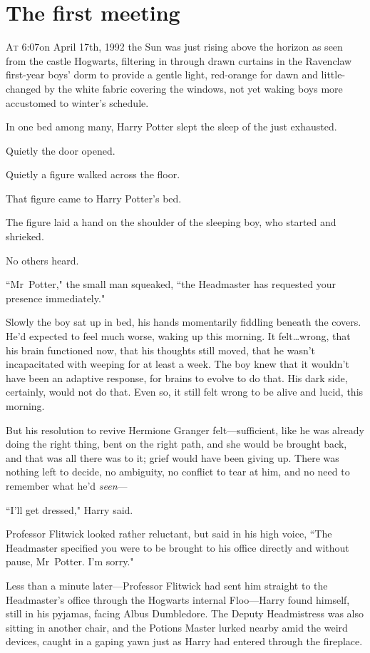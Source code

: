 
\section{The first meeting}

\lettrine{A}{t} 6:07\am on April 17th, 1992 the Sun was just rising above the horizon as seen from the castle Hogwarts, filtering in through drawn curtains in the Ravenclaw first-year boys' dorm to provide a gentle light, red-orange for dawn and little-changed by the white fabric covering the windows, not yet waking boys more accustomed to winter's schedule.

In one bed among many, Harry Potter slept the sleep of the just exhausted.

Quietly the door opened.

Quietly a figure walked across the floor.

That figure came to Harry Potter's bed.

The figure laid a hand on the shoulder of the sleeping boy, who started and shrieked.

No others heard.

``Mr~Potter," the small man squeaked, ``the Headmaster has requested your presence immediately."

Slowly the boy sat up in bed, his hands momentarily fiddling beneath the covers. He'd expected to feel much worse, waking up this morning. It felt…wrong, that his brain functioned now, that his thoughts still moved, that he wasn't incapacitated with weeping for at least a week. The boy knew that it wouldn't have been an adaptive response, for brains to evolve to do that. His dark side, certainly, would not do that. Even so, it still felt wrong to be alive and lucid, this morning.

But his resolution to revive Hermione Granger felt—sufficient, like he was already doing the right thing, bent on the right path, and she would be brought back, and that was all there was to it; grief would have been giving up. There was nothing left to decide, no ambiguity, no conflict to tear at him, and no need to remember what he'd \emph{seen}—

``I'll get dressed," Harry said.

Professor Flitwick looked rather reluctant, but said in his high voice, ``The Headmaster specified you were to be brought to his office directly and without pause, Mr~Potter. I'm sorry."

Less than a minute later—Professor Flitwick had sent him straight to the Headmaster's office through the Hogwarts internal Floo—Harry found himself, still in his pyjamas, facing Albus Dumbledore. The Deputy Headmistress was also sitting in another chair, and the Potions Master lurked nearby amid the weird devices, caught in a gaping yawn just as Harry had entered through the fireplace.

